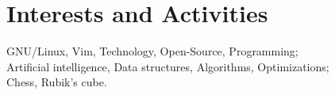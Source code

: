 \documentclass[a4paper,10pt]{article}
\begin{document}
\section{Interests and Activities}
    GNU/Linux, Vim, Technology, Open-Source, Programming; \\
    Artificial intelligence, Data structures, Algorithms, Optimizations; \\
    Chess, Rubik's cube.
\end{document}
